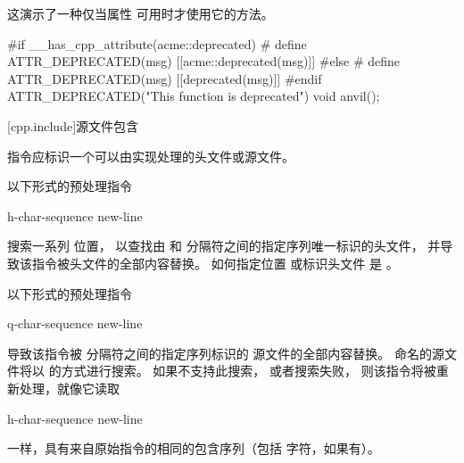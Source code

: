     \pnum
    \begin{example}
    这演示了一种仅当属性  可用时才使用它的方法。
    \begin{codeblock}
    #if __has_cpp_attribute(acme::deprecated)
    #  define ATTR_DEPRECATED(msg) [[acme::deprecated(msg)]]
    #else
    #  define ATTR_DEPRECATED(msg) [[deprecated(msg)]]
    #endif
    ATTR_DEPRECATED("This function is deprecated") void anvil();
    \end{codeblock}
    \end{example}
    
    [cpp.include]{源文件包含}
    
    \pnum
    指令应标识一个可以由实现处理的头文件或源文件。
    
    \pnum
    以下形式的预处理指令
    \begin{ncsimplebnf}
     h-char-sequence \terminal{>} new-line
    \end{ncsimplebnf}
    搜索一系列
    位置，
    以查找由
    \tcode{<}
    和
    \tcode{>}
    分隔符之间的指定序列唯一标识的头文件，
    并导致该指令被头文件的全部内容替换。
    如何指定位置
    或标识头文件
    是 。
    
    \pnum
    以下形式的预处理指令
    \begin{ncsimplebnf}
     q-char-sequence  new-line
    \end{ncsimplebnf}
    导致该指令被
    分隔符之间的指定序列标识的
    源文件的全部内容替换。
    命名的源文件将以
    的方式进行搜索。
    如果不支持此搜索，
    或者搜索失败，
    则该指令将被重新处理，就像它读取
    \begin{ncsimplebnf}
     h-char-sequence \terminal{>} new-line
    \end{ncsimplebnf}
    一样，具有来自原始指令的相同的包含序列（包括
    \tcode{>}
    字符，如果有）。
    
